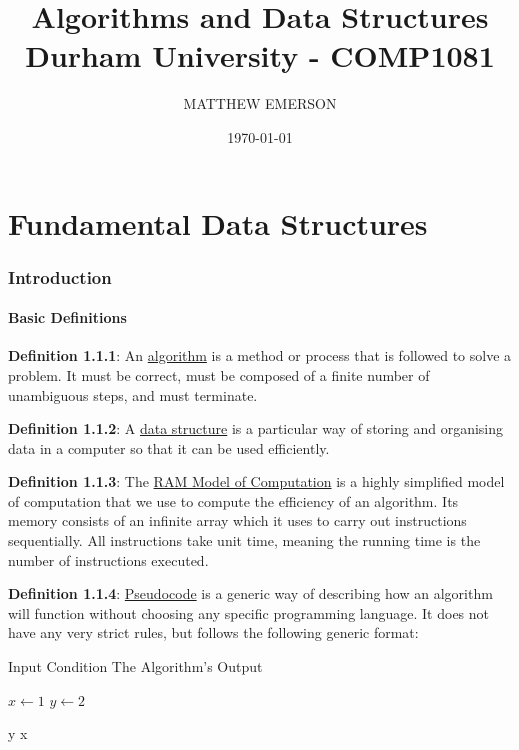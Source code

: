 \documentclass{article}
\title{Algorithms and Data Structures \\\small{Durham University - COMP1081}}
\author{MATTHEW EMERSON}
\date{\monthyeardate\today} %
\newcommand{\separate}[1] {\vspace{#1 pt}\noindent}
\newcommand{\definition}[2]{\textbf{Definition #1}: #2\label{def:#1}}
\begin{document}
\maketitle
\thispagestyle{empty}

\newpage\thispagestyle{empty}
\tableofcontents

\setcounter{page}{0}\newpage %

\part{Fundamental Data Structures}\label{part:1.fds}

\section{Introduction}

\subsection{Basic Definitions}

\definition{1.1.1}{An \underline{algorithm} is a method or process that is followed to solve a problem. It must be correct, must be composed of a finite number of unambiguous steps, and must terminate.}

\separate{5}\definition{1.1.2}{A \underline{data structure} is a particular way of storing and organising data in a computer so that it can be used efficiently.}

\separate{5}\definition{1.1.3}{The \underline{RAM Model of Computation} is a highly simplified model of computation that we use to compute the efficiency of an algorithm. Its memory consists of an infinite array which it uses to carry out instructions sequentially. All instructions take unit time, meaning the running time is the number of instructions executed.}

\separate{5}\definition{1.1.4}{\underline{Pseudocode} is a generic way of describing how an algorithm will function without choosing any specific programming language. It does not have any very strict rules, but follows the following generic format:}
\begin{algorithm}
    \caption{Example Pseducode}
    \begin{algorithmic}
        \Require Input Condition
        \Ensure The Algorithm's Output
        
        \State \(x \gets 1\)
        \State \(y \gets 2\)

            \State \Return y
        \Else
            \State \Return x
        \EndIf
    \end{algorithmic}
\end{algorithm}
\end{document}
